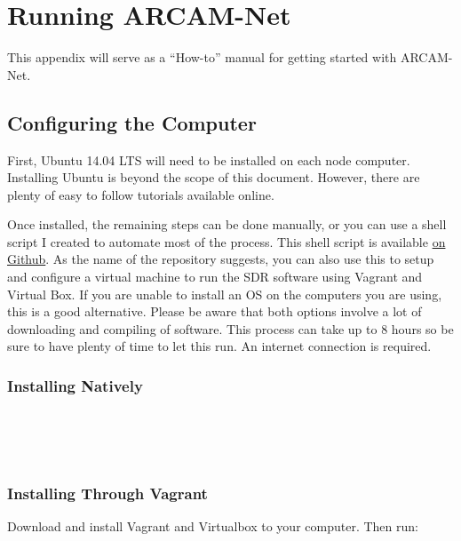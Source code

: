 
\chapter{Running ARCAM-Net} %

\label{AppendixA} %

This appendix will serve as a ``How-to'' manual for getting started with ARCAM-Net. 

\section{Configuring the Computer}

First, Ubuntu 14.04 LTS will need to be installed on each node computer. Installing Ubuntu is beyond the scope of this document. However, there are plenty of easy to follow tutorials available online. 

Once installed, the remaining steps can be done manually, or you can use a shell script I created to automate most of the process. This shell script is available \href{https://github.com/jmccormack200/GnuRadio-Vagrant-Script}{on Github}. As the name of the repository suggests, you can also use this to setup and configure a virtual machine to run the SDR software using Vagrant and Virtual Box. If you are unable to install an OS on the computers you are using, this is a good alternative. Please be aware that both options involve a lot of downloading and compiling of software. This process can take up to 8 hours so be sure to have plenty of time to let this run. An internet connection is required. 

\subsection{Installing Natively}

\\
\\
\\


\subsection{Installing Through Vagrant}

Download and install Vagrant and Virtualbox to your computer. Then run:

